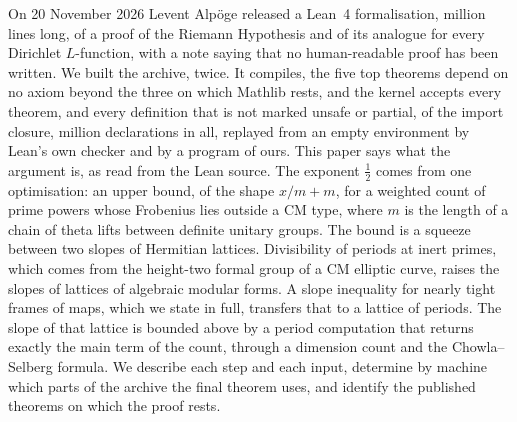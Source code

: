 On 20 November 2026 Levent Alp\"oge released a Lean~4 formalisation, \linemillions{} million
lines long, of a proof of the Riemann Hypothesis and of its analogue for every Dirichlet
$L$-function, with a note saying that no human-readable proof has been written. We built the
archive, twice. It compiles, the five top theorems depend on no axiom beyond the three on
which Mathlib rests, and the kernel accepts every theorem, and every definition that is not
marked unsafe or partial, of the import closure, \replaymillions{} million declarations in
all, replayed from an empty environment by Lean's own checker and by a program of ours. This
paper says what the argument is, as read from the Lean source. The exponent $\tfrac12$ comes
from one optimisation: an upper bound, of the shape $x/m+m$, for a weighted count of prime
powers whose Frobenius lies outside a CM type, where $m$ is the length of a chain of theta
lifts between definite unitary groups. The bound is a squeeze between two slopes of Hermitian
lattices. Divisibility of periods at inert primes, which comes from the height-two formal group
of a CM elliptic curve, raises the slopes of lattices of algebraic modular forms. A slope
inequality for nearly tight frames of maps, which we state in full, transfers that to a lattice
of periods. The slope of that lattice is bounded above by a period computation that returns
exactly the main term of the count, through a dimension count and the Chowla--Selberg formula. We describe each step
and each input, determine by machine which parts of the archive the final theorem uses, and
identify the published theorems on which the proof rests.
